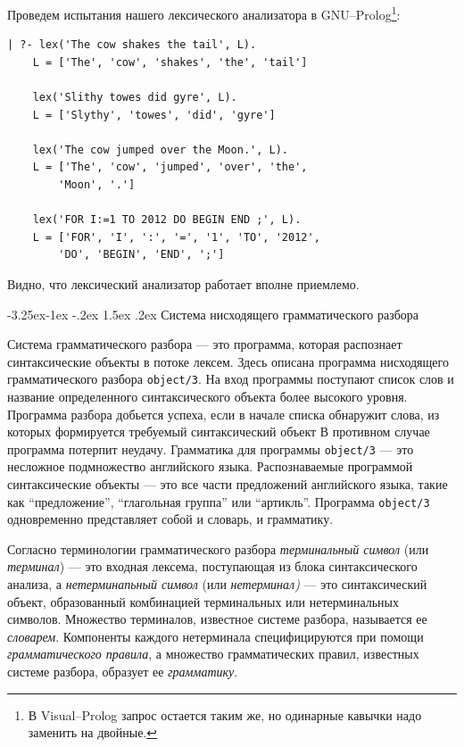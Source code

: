 \documentclass[12pt, openany, twoside]{book} %
\makeatletter
\renewcommand\subsection{\@startsection{subsection}{2}{\z@}%
                                     {-3.25ex\@plus -1ex \@minus -.2ex}%
                                     {1.5ex \@plus .2ex}%
                                     {\normalfont\normalsize\bfseries}}
\makeatother
\begin{document}
Проведем испытания нашего лексического анализатора в GNU--Prolog\footnote{В Visual--Prolog запрос остается таким же, но одинарные кавычки надо заменить на двойные.}:
{\tt\begin{verbatim}
| ?- lex('The cow shakes the tail', L).
    L = ['The', 'cow', 'shakes', 'the', 'tail']

    lex('Slithy towes did gyre', L).
    L = ['Slythy', 'towes', 'did', 'gyre']

    lex('The cow jumped over the Moon.', L).
    L = ['The', 'cow', 'jumped', 'over', 'the',
        'Moon', '.']

    lex('FOR I:=1 TO 2012 DO BEGIN END ;', L).
    L = ['FOR', 'I', ':', '=', '1', 'TO', '2012',
        'DO', 'BEGIN', 'END', ';']
\end{verbatim}}
\noindent Видно, что лексический анализатор работает вполне приемлемо.

\subsection{Система нисходящего грамматического разбора}

Система грамматического разбора --- это программа, которая распознает синтаксические объекты в потоке лексем. Здесь описана программа нисходящего грамматического разбора {\tt object/3}. На вход программы поступают список слов и название определенного синтаксического объекта более высокого уровня. Программа разбора добьется успеха, если в начале списка обнаружит слова, из которых формируется требуемый синтаксический объект В противном случае программа потерпит неудачу. Грамматика для программы {\tt object/3} --- это несложное подмножество английского языка. Распознаваемые программой синтаксические объекты --- это все части предложений английского языка, такие как ``предложение'', ``глагольная группа'' или ``артикль''. Программа {\tt object/3} одновременно представляет собой и словарь, и грамматику.

Согласно терминологии грамматического разбора \emph{терминальный символ} (или \emph{терминал}) --- это входная лексема, поступающая из блока синтаксического анализа, а \emph{нетерминапьный символ} (или \emph{нетерминал)} --- это синтаксический объект, образованный комбинацией терминальных или нетерминальных символов. Множество терминалов, известное системе разбора, называется ее \emph{словарем}. Компоненты каждого нетерминала специфицируются при помощи \emph{грамматического правила}, а множество грамматических правил, известных системе разбора, образует ее \emph{грамматику}.
\end{document}
